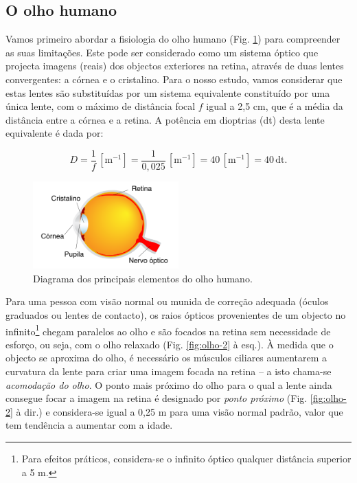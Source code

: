 \documentclass[a4paper,twoside,11pt]{report}      %
\begin{document}
\subsection{\sf O olho humano}
Vamos primeiro abordar a fisiologia do olho humano (Fig. \ref{fig:olho-1}) para compreender as suas limitações. Este pode ser considerado como um sistema óptico que projecta imagens (reais) dos objectos exteriores na retina, através de duas lentes convergentes: a córnea e o cristalino. Para o nosso estudo, vamos considerar que estas lentes são substituídas por um sistema equivalente constituído por uma única lente, com o máximo de distância focal $f$ igual a 2,5 cm, que é a média da distância entre a córnea e a retina. A potência em dioptrias (dt) desta lente equivalente é dada por:

\begin{equation}
D=\frac{1}{f} \,[\mathrm{m}^{-1}] = \frac{1}{0,025} \,[\mathrm{m}^{-1}] = 40 \,[\mathrm{m}^{-1}]=40\, \mathrm{dt}.
\end{equation}

\begin{figure}[b!]
	\centering 
	\includegraphics[width=0.5\textwidth]{olho-1}
	\caption{Diagrama dos principais elementos do olho humano. \label{fig:olho-1}} 
\end{figure}


Para uma pessoa com visão normal ou munida de correção adequada (óculos graduados ou lentes de contacto), os raios ópticos provenientes de um objecto no infinito\footnote{Para efeitos práticos, considera-se o infinito óptico qualquer distância superior a 5 m.} chegam paralelos ao olho e são focados na retina sem necessidade de esforço, ou seja, com o olho relaxado (Fig. \ref{fig:olho-2} à esq.). À medida que o objecto se aproxima do olho, é necessário os músculos ciliares aumentarem a curvatura da lente para criar uma imagem focada na retina -- a isto chama-se \emph{acomodação do olho}. O ponto mais próximo do olho para o qual a lente ainda consegue focar a imagem na retina é designado por \emph{ponto próximo} (Fig. \ref{fig:olho-2} à dir.) e considera-se igual a 0,25 m para uma visão normal padrão, valor que tem tendência a aumentar com a idade.
\end{document}
